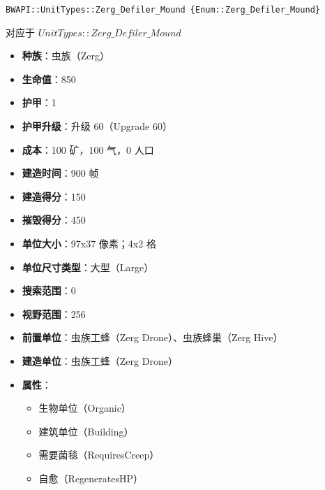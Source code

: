 \begin{tcolorbox}[colback=white, colframe=black!60!white, title=Zerg\_Defiler\_Mound(), arc=0mm]
    \begin{verbatim}
BWAPI::UnitTypes::Zerg_Defiler_Mound {Enum::Zerg_Defiler_Mound}
    \end{verbatim}
    对应于  $UnitTypes::Zerg\_Defiler\_Mound$ 
    \begin{itemize}
        \item \textbf{种族}：虫族（Zerg）
        \item \textbf{生命值}：850
        \item \textbf{护甲}：1
        \item \textbf{护甲升级}：升级 60（Upgrade 60）
        \item \textbf{成本}：100 矿，100 气，0 人口
        \item \textbf{建造时间}：900 帧
        \item \textbf{建造得分}：150
        \item \textbf{摧毁得分}：450
        \item \textbf{单位大小}：97x37 像素；4x2 格
        \item \textbf{单位尺寸类型}：大型（Large）
        \item \textbf{搜索范围}：0
        \item \textbf{视野范围}：256
        \item \textbf{前置单位}：虫族工蜂（Zerg Drone）、虫族蜂巢（Zerg Hive）
        \item \textbf{建造单位}：虫族工蜂（Zerg Drone）
        \item \textbf{属性}：
            \begin{itemize}
                \item 生物单位（Organic）
                \item 建筑单位（Building）
                \item 需要菌毯（RequiresCreep）
                \item 自愈（RegeneratesHP）
            \end{itemize}
    \end{itemize}
\end{tcolorbox}

